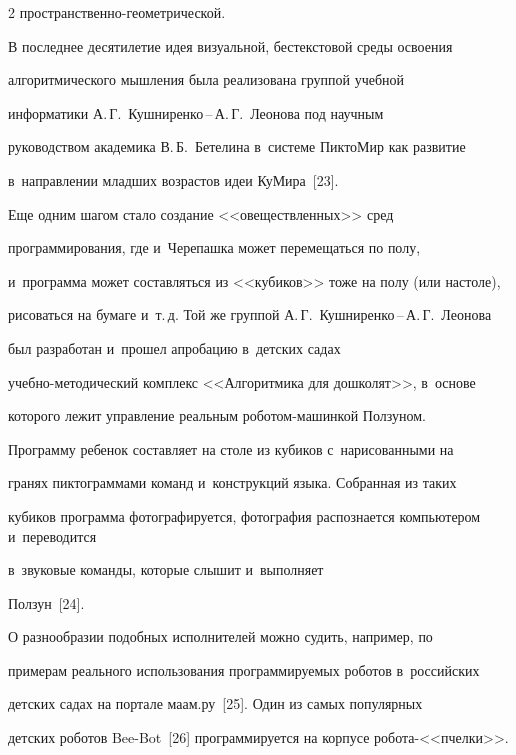 \begin{multicols}{2}
про\-стран\-ст\-вен\-но-гео\-мет\-ри\-че\-ской.


  


  В последнее десятилетие идея визуальной, бестекстовой среды освоения 


алгоритмического мышления была реализована группой учебной 


информатики А.\,Г.~Кушниренко\,--\,А.\,Г.~Леонова под научным 


руководством академика В.\,Б.~Бетелина в~системе ПиктоМир как развитие 


в~направлении младших возрастов идеи  КуМира~[23].


  


  Еще одним шагом стало создание <<овеществленных>> сред 


программирования, где и~Черепашка может перемещаться по полу, 


и~программа может составляться из <<кубиков>> тоже на полу (или на\linebreak столе), 


рисоваться на бумаге и~т.\,д. Той же \mbox{груп\-пой} А.\,Г.~Куш\-ни\-рен\-ко\,--\,А.\,Г.~Лео\-но\-ва


 был разработан и~прошел апробацию в~детских садах 


учеб\-но-ме\-то\-ди\-че\-ский комплекс <<Алгоритмика для дошколят>>, в~основе 


которого лежит управление реальным ро\-бо\-том-ма\-шин\-кой Ползуном. 


Программу ребенок составляет на столе из кубиков с~нарисованными на 


гранях пиктограммами команд и~конструкций языка. Собранная из таких 


кубиков программа фотографируется, фотография распознается компьютером и~переводится 


в~звуковые команды, которые слышит и~выполняет 


Ползун~[24].


  


  О разнообразии подобных исполнителей можно судить, например, по 


примерам реального использования программируемых роботов в~российских 


детских садах на портале {\sf маам.ру}~[25]. Один из самых популярных 


детских роботов Bee-Bot~[26] программируется на корпусе ро\-бо\-та-<<пчел\-ки>>.



\end{multicols}
